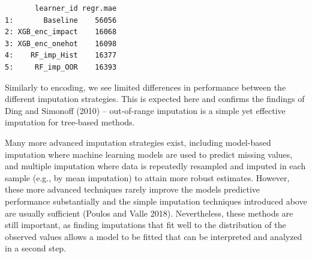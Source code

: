 \begin{Shaded}
\begin{Highlighting}[]
\OtherTok{=} \SpecialCharTok{\%\textgreater{}\textgreater{}\%} \NormalTok{(}\NormalTok{))}
\SpecialCharTok{$}\OtherTok{=} 

\OtherTok{=} \NormalTok{(}\NormalTok{(}\NormalTok{) }\SpecialCharTok{\%\textgreater{}\textgreater{}\%} \NormalTok{(}\NormalTok{))}
\SpecialCharTok{$}\OtherTok{=} 

\OtherTok{=} 
\OtherTok{=} 
\SpecialCharTok{$}
\SpecialCharTok{$}\NormalTok{(}
\end{Highlighting}
\end{Shaded}

\begin{verbatim}
       learner_id regr.mae
1:       Baseline    56056
2: XGB_enc_impact    16068
3: XGB_enc_onehot    16098
4:    RF_imp_Hist    16377
5:     RF_imp_OOR    16393
\end{verbatim}

Similarly to encoding, we see limited differences in performance between
the different imputation strategies. This is expected here and confirms
the findings of Ding and Simonoff (2010) -- out-of-range imputation is a
simple yet effective imputation for tree-based methods.

Many more advanced imputation strategies exist, including model-based
imputation where machine learning models are used to predict missing
values, and multiple imputation where data is repeatedly resampled and
imputed in each sample (e.g., by mean imputation) to attain more robust
estimates. However, these more advanced techniques rarely improve the
models predictive performance substantially and the simple imputation
techniques introduced above are usually sufficient (Poulos and Valle
2018). Nevertheless, these methods are still important, as finding
imputations that fit well to the distribution of the observed values
allows a model to be fitted that can be interpreted and analyzed in a
second step.

